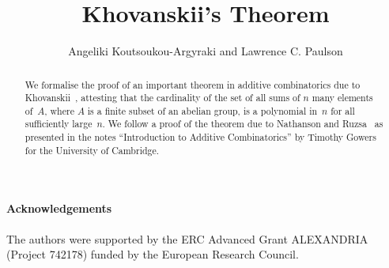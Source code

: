 \documentclass[11pt,a4paper]{article}
\begin{document}
\title{Khovanskii's Theorem}
\author{Angeliki Koutsoukou-Argyraki and Lawrence C. Paulson}
\maketitle

\begin{abstract}
We formalise the proof of an important theorem in additive combinatorics due to Khovanskii~\cite{khovanskii-newton-polyhedron,khovanskii-sums-finite}, 
attesting that the cardinality of the set of all sums of $n$ many elements of~$A$, where $A$ is a finite subset of an abelian group, is a polynomial in~$n$ for all sufficiently large~$n$. 
We follow a proof of the theorem due to Nathanson and Ruzsa~\cite{nathanson-polynomial-growth,ruzsa-sumsets-structure} as presented in the notes ``Introduction to Additive Combinatorics''
by Timothy Gowers~\cite{gowers-introduction-additive} for the University of Cambridge. 
\end{abstract}

\newpage
\tableofcontents

\paragraph*{Acknowledgements}
The authors were supported by the ERC Advanced Grant ALEXANDRIA (Project 742178) funded by the European Research Council. 

\newpage





\end{document}
